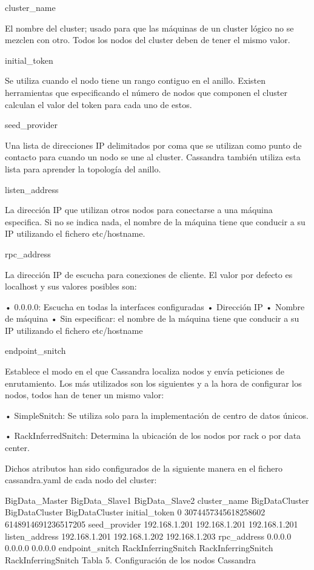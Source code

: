 cluster_name

El nombre del cluster; usado para que las máquinas de un cluster lógico no se mezclen con otro. Todos los nodos del cluster deben de tener el mismo valor.

initial_token

Se utiliza cuando el nodo tiene un rango contiguo en el anillo. Existen herramientas que especificando el número de nodos que componen el cluster calculan el valor del token para cada uno de estos.

seed_provider

Una lista de direcciones IP delimitados por coma que se utilizan como punto de contacto para cuando un nodo se une al cluster. Cassandra también utiliza esta lista para aprender la topología del anillo.

listen_address

La dirección IP que utilizan otros nodos para conectarse a una máquina especifica. Si no se indica nada, el nombre de la máquina tiene que conducir a su IP utilizando el fichero etc/hostname.

rpc_address

La dirección IP de escucha para conexiones de cliente. El valor por defecto es localhost y sus valores posibles son:

•	0.0.0.0: Escucha en todas la interfaces configuradas
•	Dirección IP
•	Nombre de máquina
•	Sin especificar: el nombre de la máquina tiene que conducir a su IP utilizando el fichero etc/hostname

endpoint_snitch

Establece el modo en el que Cassandra localiza nodos y envía peticiones de enrutamiento. Los más utilizados son los siguientes y a la hora de configurar los nodos, todos han de tener un mismo valor:

•	SimpleSnitch: Se utiliza solo para la implementación de centro de datos únicos.

•	RackInferredSnitch: Determina la ubicación de los nodos por rack o por data center. 

Dichos atributos han sido configurados de la siguiente manera en el fichero cassandra.yaml de cada nodo del cluster: 

BigData_Master	BigData_Slave1	BigData_Slave2
cluster_name	BigDataCluster	BigDataCluster	BigDataCluster
initial_token	0	3074457345618258602	6148914691236517205
seed_provider	192.168.1.201	192.168.1.201	192.168.1.201
listen_address	192.168.1.201	192.168.1.202	192.168.1.203
rpc_address	0.0.0.0	0.0.0.0	0.0.0.0
endpoint_snitch	RackInferringSnitch	RackInferringSnitch	RackInferringSnitch
Tabla 5. Configuración de los nodos Cassandra

